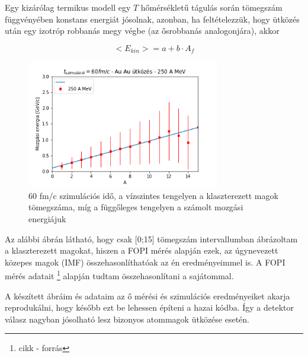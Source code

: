 \documentclass[a4paper,12pt]{article}
\begin{document}
\vspace{5mm}

\par Egy kizárólag termikus modell egy $T$ hőmérsékletű tágulás során tömegszám függvényében konstans energiát jósolnak, azonban, ha feltételezzük, hogy ütközés után egy izotróp robbanás megy végbe (az ősrobbanás analogonjára), akkor 

\vspace{5mm}

\begin{equation}
<E_{kin}> = a + b\cdot A_{f}
\end{equation}

\vspace{5mm}

\begin{figure}[!htb]
\centering
\includegraphics[width=0.75\textwidth]{./60fmcAuAu250AMeV007mom.png}
\caption{60 fm/c szimulációs idő, a vízszintes tengelyen a klaszterezett magok tömegszáma, míg a függőleges tengelyen a számolt mozgási energiájuk}
\end{figure}

\par Az alábbi ábrán látható, hogy csak [0;15] tömegszám intervallumban ábrázoltam a klaszterezett magokat, hiszen a FOPI mérés alapján ezek, az úgynevezett közepes magok (IMF) összehasonlíthatóak az én eredményeimmel is. A FOPI mérés adatait \footnote{cikk - forrás} alapján tudtam összehasonlítani a sajátommal.

\vspace{5mm}

\par A készített ábráim és adataim az ő mérési és szimulációs eredményeiket akarja reprodukálni, hogy később ezt be lehessen építeni a hazai kódba. Így a detektor válasz nagyban jósolható lesz bizonyos atommagok ütközése esetén.
\end{document}
